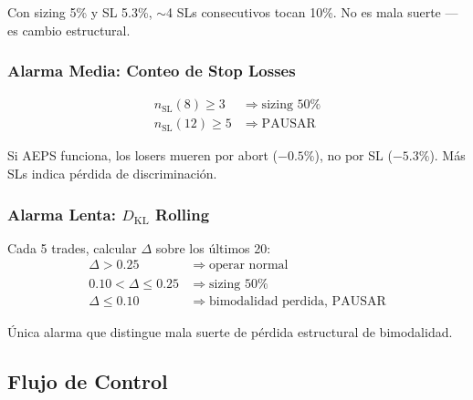 \documentclass[11pt,a4paper]{article}
\newcommand{\KL}{D_{\mathrm{KL}}}
\begin{document}
Con sizing 5\% y SL 5.3\%, $\sim$4 SLs consecutivos tocan 10\%.
No es mala suerte --- es cambio estructural.

\subsubsection{Alarma Media: Conteo de Stop Losses}

\begin{align}
n_{\text{SL}}(8) \geq 3 &\;\Rightarrow\; \text{sizing 50\%} \\
n_{\text{SL}}(12) \geq 5 &\;\Rightarrow\; \text{PAUSAR}
\end{align}

Si AEPS funciona, los losers mueren por abort ($-0.5\%$), no por
SL ($-5.3\%$). M\'as SLs indica p\'erdida de discriminaci\'on.

\subsubsection{Alarma Lenta: $\KL$ Rolling}

Cada 5 trades, calcular $\Delta$ sobre los \'ultimos 20:
\begin{align}
\Delta > 0.25 &\;\Rightarrow\; \text{operar normal} \\
0.10 < \Delta \leq 0.25 &\;\Rightarrow\; \text{sizing 50\%} \\
\Delta \leq 0.10 &\;\Rightarrow\; \text{bimodalidad perdida, PAUSAR}
\end{align}

\'Unica alarma que distingue mala suerte de p\'erdida estructural
de bimodalidad.

\subsection{Flujo de Control}
\end{document}
